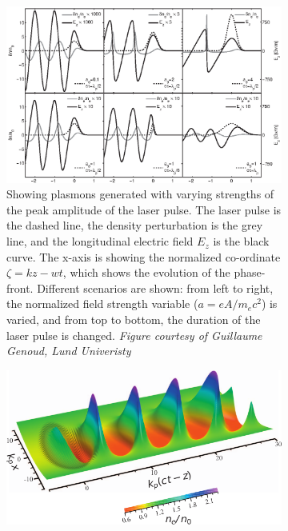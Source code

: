 \documentclass[12pt,letter]{article}
\begin{document}
\begin{figure}[h!]
        \begin{singlespace*}
        \centering
        \begin{subfigure}[t]{\textwidth}
            \includegraphics[height = .4\textheight]{../figures/densityandewave.eps}
            \caption{\small  Showing plasmons generated with varying strengths of the peak
                amplitude of the laser pulse.\cite{genothesis}\label{fig:plasmon}
                The laser pulse is the dashed line, the density perturbation is the grey
                line, and the longitudinal electric field $E_z$ is the black
                curve. The x-axis is showing the normalized co-ordinate $\zeta =
                kz - wt$, which shows the evolution of the phase-front. Different
                scenarios are shown: from left to right, the normalized field strength variable
                ($a = eA/m_e c^2$) is varied, and from top to bottom, the duration of
                the laser pulse is changed. \em Figure courtesy of Guillaume Genoud, Lund
            Univeristy}
        \end{subfigure}

        \begin{subfigure}[t]{\textwidth}
            \includegraphics[height = .3\textheight]{../figures/esarey3dnonlin.pdf}


\end{subfigure}
\end{singlespace*}
\end{figure}
\end{document}
